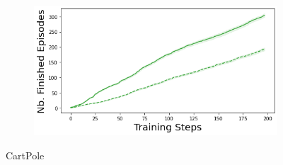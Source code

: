 \begin{figure}
\begin{subfigure}{.24\textwidth}
    \end{subfigure}
    \begin{subfigure}{.24\textwidth}
        \includegraphics[width=\textwidth]{sections/011_icml2022/resources/acrobot-n_finished_training_episodes-postnet-training-strategy.png}
    \end{subfigure}
    \vspace{-3mm}
    \caption*{CartPole}
    \vspace{2mm}
    

\end{figure}
